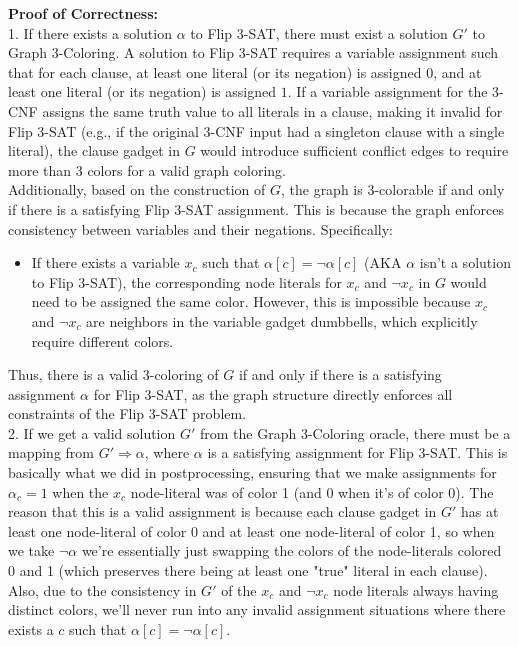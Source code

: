 \documentclass[11pt]{article}
\begin{document}
\begin{enumerate}
\begin{enumerate}
        \textbf{Proof of Correctness:} \\

        1. If there exists a solution $\alpha$ to Flip 3-SAT, there must exist a solution $G'$ to Graph 3-Coloring. A solution to Flip 3-SAT requires a variable assignment such that for each clause, at least one literal (or its negation) is assigned $0$, and at least one literal (or its negation) is assigned $1$. If a variable assignment for the 3-CNF assigns the same truth value to all literals in a clause, making it invalid for Flip 3-SAT (e.g., if the original 3-CNF input had a singleton clause with a single literal), the clause gadget in $G$ would introduce sufficient conflict edges to require more than $3$ colors for a valid graph coloring. \\
        Additionally, based on the construction of $G$, the graph is 3-colorable if and only if there is a satisfying Flip 3-SAT assignment. This is because the graph enforces consistency between variables and their negations. Specifically: 
        \begin{itemize}
            \item If there exists a variable $x_c$ such that $\alpha[c] = \neg \alpha[c]$ (AKA $\alpha$ isn't a solution to Flip 3-SAT), the corresponding node literals for $x_c$ and $\neg x_c$ in $G$ would need to be assigned the same color. However, this is impossible because $x_c$ and $\neg x_c$ are neighbors in the variable gadget dumbbells, which explicitly require different colors.
        \end{itemize} 
        Thus, there is a valid 3-coloring of $G$ if and only if there is a satisfying assignment $\alpha$ for Flip 3-SAT, as the graph structure directly enforces all constraints of the Flip 3-SAT problem. \\

        2. If we get a valid solution $G'$ from the Graph 3-Coloring oracle, there must be a mapping from $G' \Rightarrow \alpha$, where $\alpha$ is a satisfying assignment for Flip 3-SAT. This is basically what we did in postprocessing, ensuring that we make assignments for $\alpha_c = 1$ when the $x_c$ node-literal was of color 1 (and 0 when it's of color 0). The reason that this is a valid assignment is because each clause gadget in $G'$ has at least one node-literal of color 0 and at least one node-literal of color 1, so when we take $\neg \alpha$ we're essentially just swapping the colors of the node-literals colored 0 and 1 (which preserves there being at least one "true" literal in each clause). Also, due to the consistency in $G'$ of the $x_c$ and $\neg x_c$ node literals always having distinct colors, we'll never run into any invalid assignment situations where there exists a $c$ such that $\alpha[c] = \neg \alpha[c]$. \\


\end{enumerate}
\end{enumerate}
\end{document}
